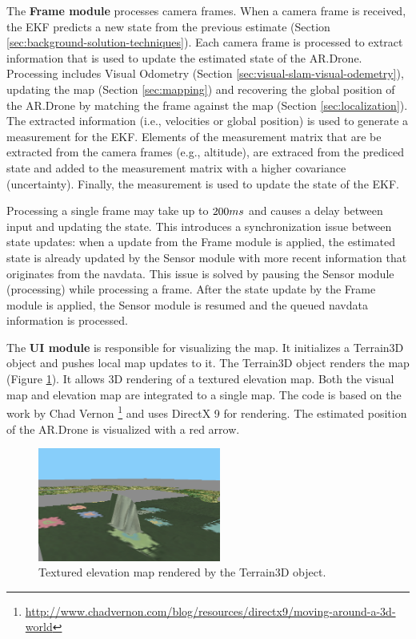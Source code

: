 The \textbf{Frame module} processes camera frames.
When a camera frame is received, the EKF predicts a new state from the previous estimate (Section \ref{sec:background-solution-techniques}).
Each camera frame is processed to extract information that is used to update the estimated state of the AR.Drone.
Processing includes Visual Odometry (Section \ref{sec:visual-slam-visual-odemetry}), updating the map (Section \ref{sec:mapping}) and recovering the global position of the AR.Drone by matching the frame against the map (Section \ref{sec:localization}).
The extracted information (i.e., velocities or global position) is used to generate a measurement for the EKF.
Elements of the measurement matrix that are be extracted from the camera frames (e.g., altitude), are extraced from the prediced state and added to the measurement matrix with a higher covariance (uncertainty).
Finally, the measurement is used to update the state of the EKF.

Processing a single frame may take up to $200 \small{ms}$ and causes a delay between input and updating the state.
This introduces a synchronization issue between state updates: when a update from the Frame module is applied, the estimated state is already updated by the Sensor module with more recent information that originates from the navdata.
This issue is solved by pausing the Sensor module (processing) while processing a frame.
After the state update by the Frame module is applied, the Sensor module is resumed and the queued navdata information is processed.

The \textbf{UI module} is responsible for visualizing the map.
It initializes a Terrain3D object and pushes local map updates to it.
The Terrain3D object renders the map (Figure \ref{fig:terrain3d_map}).
It allows 3D rendering of a textured elevation map.
Both the visual map and elevation map are integrated to a single map.
The code is based on the work by Chad Vernon \footnote{\url{http://www.chadvernon.com/blog/resources/directx9/moving-around-a-3d-world}} and uses DirectX 9 for rendering.
The estimated position of the AR.Drone is visualized with a red arrow.
\begin{figure}[htb!]
\centering
\includegraphics[width=6cm]{images/3dterrain_map.png}
\caption{Textured elevation map rendered by the Terrain3D object.} 
\label{fig:terrain3d_map}
\end{figure}